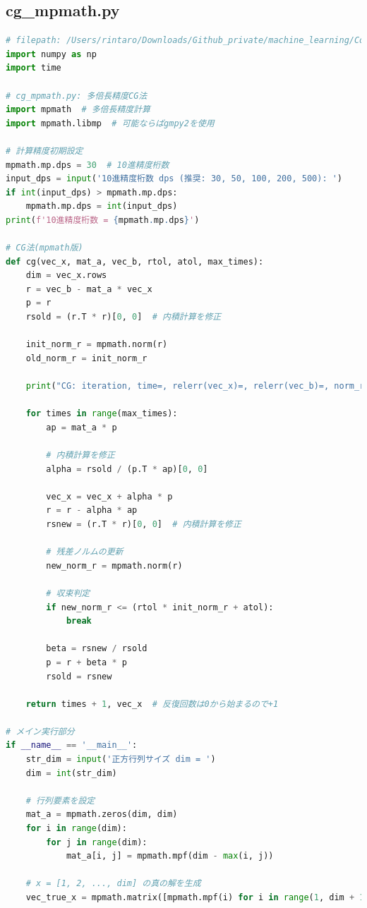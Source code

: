 \documentclass{article}
\begin{document}
\subsection{cg\_mpmath.py}
\begin{lstlisting}[language=Python, caption=cg\_mpmath.py]
# filepath: /Users/rintaro/Downloads/Github_private/machine_learning/ConjugateGradientMethodreport/cg_mpmath.py
import numpy as np
import time

# cg_mpmath.py: 多倍長精度CG法 
import mpmath  # 多倍長精度計算
import mpmath.libmp  # 可能ならばgmpy2を使用

# 計算精度初期設定
mpmath.mp.dps = 30  # 10進精度桁数
input_dps = input('10進精度桁数 dps (推奨: 30, 50, 100, 200, 500): ')
if int(input_dps) > mpmath.mp.dps:
    mpmath.mp.dps = int(input_dps)
print(f'10進精度桁数 = {mpmath.mp.dps}')

# CG法(mpmath版)
def cg(vec_x, mat_a, vec_b, rtol, atol, max_times):
    dim = vec_x.rows
    r = vec_b - mat_a * vec_x
    p = r
    rsold = (r.T * r)[0, 0]  # 内積計算を修正

    init_norm_r = mpmath.norm(r)
    old_norm_r = init_norm_r

    print("CG: iteration, time=, relerr(vec_x)=, relerr(vec_b)=, norm_r_rel")  # 追加情報
    
    for times in range(max_times):
        ap = mat_a * p
        
        # 内積計算を修正
        alpha = rsold / (p.T * ap)[0, 0]
        
        vec_x = vec_x + alpha * p
        r = r - alpha * ap
        rsnew = (r.T * r)[0, 0]  # 内積計算を修正

        # 残差ノルムの更新
        new_norm_r = mpmath.norm(r)
        
        # 収束判定
        if new_norm_r <= (rtol * init_norm_r + atol):
            break
        
        beta = rsnew / rsold
        p = r + beta * p
        rsold = rsnew
        
    return times + 1, vec_x  # 反復回数は0から始まるので+1

# メイン実行部分
if __name__ == '__main__':
    str_dim = input('正方行列サイズ dim = ')
    dim = int(str_dim)

    # 行列要素を設定
    mat_a = mpmath.zeros(dim, dim)
    for i in range(dim):
        for j in range(dim):
            mat_a[i, j] = mpmath.mpf(dim - max(i, j))
    
    # x = [1, 2, ..., dim] の真の解を生成
    vec_true_x = mpmath.matrix([mpmath.mpf(i) for i in range(1, dim + 1)])
    

\end{lstlisting}
\end{document}

